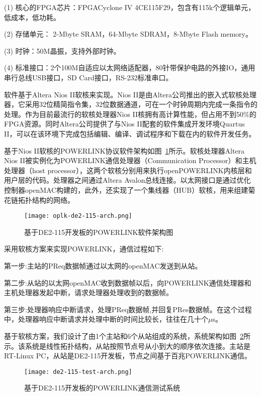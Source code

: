 (1) 核心的FPGA芯片：FPGACyclone IV 4CE115F29，包含有115k个逻辑单元，低成本，低功耗。

(2) 存储单元： 2-Mbyte SRAM，64-Mbyte SDRAM，8-Mbyte Flash memory。

(3) 时钟：50M晶振，支持外部时钟。

(4) 标准接口：2个100M自适应以太网络适配器，80针带保护电路的外接IO，通用串行总线USB接口，SD Card接口，RS-232标准串口。

软件基于Altera Nios II软核来实现。Nios II是由Altera公司推出的嵌入式软核处理器，它采用32位精简指令集，32位数据通道，可在一个时钟周期内完成一条指令的处理。作为目前最流行的软核处理器Nios II核拥有高计算性能，但占用不到50\%的FPGA资源。同时Altera公司提供了与Nios II配套的软件集成开发环境Quartus II，可以在该环境下完成包括编辑、编译、调试程序和下载在内的软件开发任务。

基于Nios II软核的POWERLINK协议软件架构如图~\ref{fig:oplk-de2-115-arch}所示。软核处理器Altera Nios II被实例化为POWERLINK通信处理器（Communication Processor）和主机处理器（host processor），这两个软核分别用来执行openPOWERLINK内核层和用户层的代码。处理器之间通过Altera Avalon总线连接。以太网接口是通过优化控制器openMAC构建的，此外，还实现了一个集线器（HUB）软核，用来组建菊花链拓扑结构的网络。

\begin{figure}[!htb]
  \centering
  \texttt{[image: oplk-de2-115-arch.png]}
  \caption{基于DE2-115开发板的POWERLINK软件架构图}
  \label{fig:oplk-de2-115-arch}
\end{figure}

采用软核方案来实现POWERLINK，通信过程如下:

第一步:主站的PReq数据帧通过以太网的openMAC发送到从站。

第二步:从站的以太网openMAC收到数据帧以后，向POWERLINK通信处理器和主机处理器发起中断，请求处理器处理收到的数据帧。

第三步:处理器响应中断请求，处理PReq数据帧,并回复PRes数据帧。在这个过程中，处理器响应中断请求并处理中断的时间比较长，往往在几十个$\mu$s。

基于软核方案，我们设计了由1个主站和6个从站组成的系统，系统架构如图~\ref{fig:de2-115-test-arch}所示。该系统是线性拓扑结构，从站按照节点号从小到大的顺序依次连接。主站是RT-Linux PC，从站是DE2-115开发板，节点之间基于百兆POWERLINK通信\cite{xksun-2018}。

\begin{figure}[!htb]
  \centering
  \texttt{[image: de2-115-test-arch.png]}
  \caption{基于DE2-115开发板的POWERLINK通信测试系统}
  \label{fig:de2-115-test-arch}
\end{figure}

